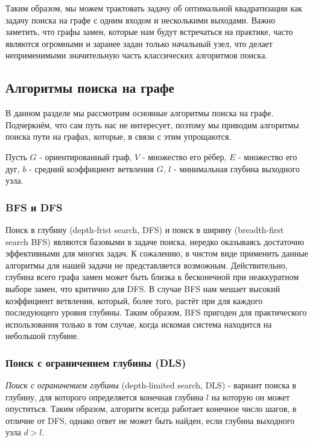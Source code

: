 Таким образом, мы можем трактовать задачу об оптимальной квадратизации как задачу поиска на графе с одним входом и несколькими выходами. Важно заметить, что графы замен, которые нам будут встречаться на практике, часто являются огромными и заранее задан только начальный узел, что делает неприменимыми значительную часть классических алгоритмов поиска.

\subsection{Алгоритмы поиска на графе} \label{sec:search-algo}

В данном разделе мы рассмотрим основные алгоритмы поиска на графе. Подчеркнём, что сам путь нас не интересует, поэтому мы приводим алгоритмы поиска пути на графах, которые, в связи с этим упрощаются.

Пусть $G$ - ориентированный граф, $V$ - множество его рёбер, $E$ - множество его дуг, $b$ - средний коэффициент ветвления $G$, $l$ - минимальная глубина выходного узла.

\subsubsection{BFS и DFS} \label{sec:BFS-DFS}

Поиск в глубину (depth-frist search, DFS) и поиск в ширину (breadth-first search BFS) являются базовыми в задаче поиска, нередко оказываясь достаточно эффективными для многих задач. К сожалению, в чистом виде применить данные алгоритмы для нашей задачи не представляется возможным. Действительно, глубина всего графа замен может быть близка к бесконечной при неаккуратном выборе замен, что критично для DFS. В случае BFS нам мешает высокий коэффициент ветвления, который, более того, растёт при для каждого последующего уровня глубины. Таким образом, BFS пригоден для практического использования только в том случае, когда искомая система находится на небольшой глубине. 

\subsubsection{Поиск с ограничением глубины (DLS)} \label{sec:DLS}

\begin{definition}
    \textit{Поиск с ограничением глубины} (depth-limited search, DLS) \cite{Korf-ID-DFS} - вариант поиска в глубину, для которого определяется конечная глубина $l$ на которую он может опуститься. Таким образом, алгоритм всегда работает конечное число шагов, в отличие от DFS, однако ответ не может быть найден, если глубина выходного узла $d > l$.
\end{definition}

